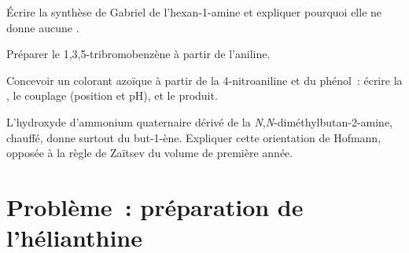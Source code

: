 \begin{exercise}[$\star\star$]\label{exo:b2:amines:9}
Écrire la synthèse de Gabriel de l'hexan-1-amine et expliquer pourquoi elle ne donne aucune .
\end{exercise}

\begin{exercise}[$\star\star\star$]\label{exo:b2:amines:10}
Préparer le 1,3,5-tribromobenzène à partir de l'aniline.
\end{exercise}

\begin{exercise}[$\star\star\star$]\label{exo:b2:amines:11}
Concevoir un colorant azoïque à partir de la 4-nitroaniline et du phénol~: écrire la ,
le couplage (position et pH), et le produit.
\end{exercise}

\begin{exercise}[$\star\star\star$]\label{exo:b2:amines:12}
L'hydroxyde d'ammonium quaternaire dérivé de la \textit{N},\textit{N}-diméthylbutan-2-amine,
chauffé, donne surtout du but-1-ène. Expliquer cette orientation de Hofmann, opposée à la règle
de Zaïtsev du volume de première année.
\end{exercise}

\section{Problème~: préparation de l'hélianthine}


